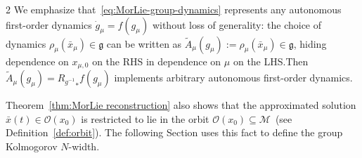 \documentclass{article}
\newcommand{\M}{\mathcal{M}}                                %
\newcommand{\g}{\mathfrak{g}}                               %
\newcommand{\state}{x}
\newcommand{\appstate}{\bar{x}}
\begin{document}
\begin{multicols}{2}
We emphasize that~\eqref{eq:MorLie-group-dynamics} represents any autonomous first-order dynamics $\dot{g}_\mu = f(g_\mu)$ without loss of generality: the choice of dynamics $\rho_\mu(\appstate_\mu) \in\g$ can be written as $\widetilde{A}_\mu(g_\mu) := \rho_\mu(\appstate_\mu) \in\g$, hiding dependence on $\state_{\mu,0}$ on the RHS in dependence on $\mu$ on the LHS.\@ Then $\widetilde{A}_\mu(g_\mu) = {R_{g^{-1}}}_*f(g_\mu)$ implements arbitrary autonomous first-order dynamics.

Theorem~\ref{thm:MorLie reconstruction} also shows that the approximated solution $\appstate(t) \in \mathcal{O}(\state_0)$ is restricted to lie in the orbit $\mathcal{O}(\state_0) \subseteq \M\,$ (see Definition~\ref{def:orbit}). The following Section uses this fact to define the group Kolmogorov $N$-width.



\end{multicols}
\end{document}
